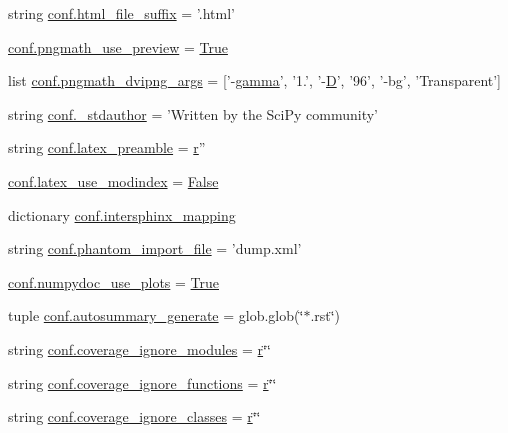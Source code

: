 \begin{DoxyCompactItemize}
\item 
string \hyperlink{namespaceconf_a1baa1b929fcf352b86f395c155f18fe9}{conf.\+html\+\_\+file\+\_\+suffix} = '.html'
\item 
\hyperlink{namespaceconf_a961bac4a1aae8c9a69ef34c1b0d92e67}{conf.\+pngmath\+\_\+use\+\_\+preview} = \hyperlink{libqhull_8h_add3ca9eefe3b5b754426f51d3043e579}{True}
\item 
list \hyperlink{namespaceconf_ab3a89593e7b7c63c11c3921f4f2aad4d}{conf.\+pngmath\+\_\+dvipng\+\_\+args} = \mbox{[}'-\/\hyperlink{gamma__fort_8f_a16d7e3244b98c48f1960c796bde8b92f}{gamma}', '1.', '-\/\hyperlink{odrpack_8h_a7dae6ea403d00f3687f24a874e67d139}{D}', '96', '-\/bg', 'Transparent'\mbox{]}
\item 
string \hyperlink{namespaceconf_a519aa7ef43ac5c9d622ced8a6dfd613c}{conf.\+\_\+stdauthor} = 'Written by the Sci\+Py community'
\item 
string \hyperlink{namespaceconf_a71183e61f5009895b3ffe041296e6af9}{conf.\+latex\+\_\+preamble} = \hyperlink{indexexpr_8h_ac434fd11cc2493608d8d91424d60c17e}{r}''
\item 
\hyperlink{namespaceconf_acaffe3a51cfe6aaebb3becbb1306a675}{conf.\+latex\+\_\+use\+\_\+modindex} = \hyperlink{libqhull_8h_a306ebd41c0cd1303b1372c6153f0caf8}{False}
\item 
dictionary \hyperlink{namespaceconf_a8375f4f963de3ac8026eaa9beced9564}{conf.\+intersphinx\+\_\+mapping}
\item 
string \hyperlink{namespaceconf_ad772d138ab2c222323364557f70434f6}{conf.\+phantom\+\_\+import\+\_\+file} = 'dump.\+xml'
\item 
\hyperlink{namespaceconf_a0b60d28b58b5b39a56f566734dec27bb}{conf.\+numpydoc\+\_\+use\+\_\+plots} = \hyperlink{libqhull_8h_add3ca9eefe3b5b754426f51d3043e579}{True}
\item 
tuple \hyperlink{namespaceconf_a790a07d2f0a86a011425cc6070929a40}{conf.\+autosummary\+\_\+generate} = glob.\+glob(\char`\"{}$\ast$.rst\char`\"{})
\item 
string \hyperlink{namespaceconf_ae217131f12bdd813b6a750a55e9ba96d}{conf.\+coverage\+\_\+ignore\+\_\+modules} = \hyperlink{indexexpr_8h_ac434fd11cc2493608d8d91424d60c17e}{r}\char`\"{}\char`\"{}
\item 
string \hyperlink{namespaceconf_a0bb8fea05080545aa636fc04ede8f2c3}{conf.\+coverage\+\_\+ignore\+\_\+functions} = \hyperlink{indexexpr_8h_ac434fd11cc2493608d8d91424d60c17e}{r}\char`\"{}\char`\"{}
\item 
string \hyperlink{namespaceconf_a0f16455586b86a7409d4448b17046361}{conf.\+coverage\+\_\+ignore\+\_\+classes} = \hyperlink{indexexpr_8h_ac434fd11cc2493608d8d91424d60c17e}{r}\char`\"{}\char`\"{}

\end{DoxyCompactItemize}
